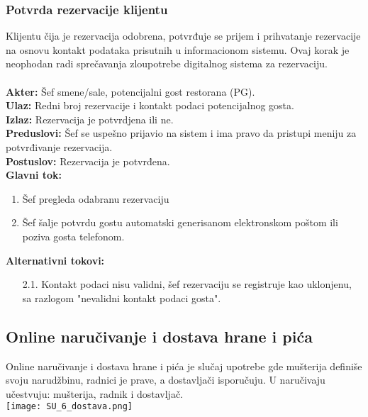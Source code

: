 \documentclass{article}
\begin{document}
\subsubsection{Potvrda rezervacije klijentu}
Klijentu čija je rezervacija odobrena, potvrđuje se prijem i prihvatanje rezervacije na osnovu kontakt podataka prisutnih u informacionom sistemu. Ovaj korak je neophodan radi sprečavanja zloupotrebe digitalnog sistema za rezervaciju.\\\\
\textbf{Akter:} Šef smene/sale, potencijalni gost restorana (PG).\\
\textbf{Ulaz:} Redni broj rezervacije i kontakt podaci potencijalnog gosta.\\
\textbf{Izlaz:} Rezervacija je potvrdjena ili ne.\\
\textbf{Preduslovi:} Šef se uspešno prijavio na sistem i ima pravo da pristupi meniju za potvrđivanje rezervacija.\\
\textbf{Postuslov:} Rezervacija je potvrđena.\\
\textbf{Glavni tok:}
\begin{enumerate}
\item Šef pregleda odabranu rezervaciju
\item Šef šalje potvrdu gostu automatski generisanom elektronskom poštom ili poziva gosta telefonom.\\
\end{enumerate}
\textbf{Alternativni tokovi:}\\
\begin{itemize}
\item [2.1.] Kontakt podaci nisu validni, šef rezervaciju se  registruje kao uklonjenu, sa razlogom "nevalidni kontakt podaci gosta".
\end{itemize}
  

\subsection{Online naručivanje i dostava hrane i pića}
Online naručivanje i dostava hrane i pića je slučaj upotrebe gde mušterija definiše svoju narudžbinu, radnici je prave, a dostavljači isporučuju. U naručivaju učestvuju: mušterija, radnik i dostavljač.
\\
\texttt{[image: SU\_6\_dostava.png]}
\end{document}

